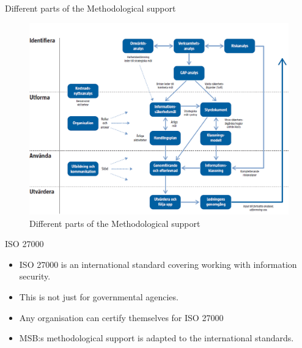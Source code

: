 \documentclass{beamer}
\begin{document}
\begin{frame}{Different parts of the Methodological support}
  \begin{figure}
    \includegraphics[width=\textwidth]{Figures/oversiktsbild-over-metodstegens-olika-delar-och-hur-de-relaterar-till-varandra.png}
    \caption{Different parts of the Methodological support~\cite{msb_metodstod}}
  \end{figure}
\end{frame}

\begin{frame}{ISO 27000}
  \begin{itemize}
    \item ISO 27000 is an international standard covering working with
      information security.
    \item This is not just for governmental agencies.
    \item Any organisation can certify themselves for ISO 27000
    \item MSB:s methodological support is adapted to the international
      standards.
  \end{itemize}
\end{frame}
\end{document}
